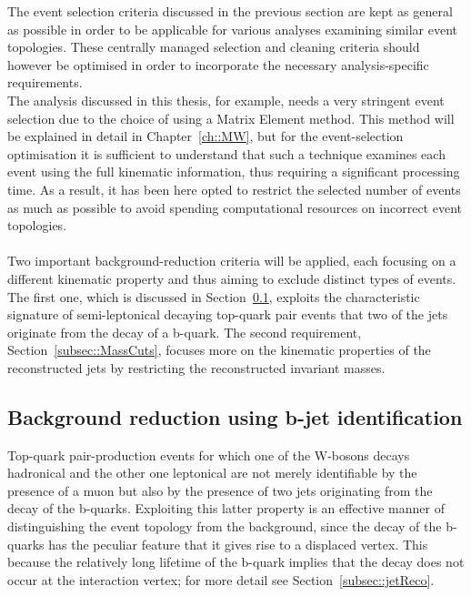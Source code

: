 The event selection criteria discussed in the previous section are kept as general as possible in order to be applicable for various analyses examining similar event topologies.
These centrally managed selection and cleaning criteria should however be optimised in order to incorporate the necessary analysis-specific requirements.
\\
The analysis discussed in this thesis, for example, needs a very stringent event selection due to the choice of using a Matrix Element method.
This method will be explained in detail in Chapter~\ref{ch::MW}, but for the event-selection optimisation it is sufficient to understand that such a technique examines each event using the full kinematic information, thus requiring a significant processing time. As a result, it has been here opted to restrict the selected number of events as much as possible to avoid spending computational resources on incorrect event topologies.
\\
\\
Two important background-reduction criteria will be applied, each focusing on a different kinematic property and thus aiming to exclude distinct types of events. 
The first one, which is discussed in Section~\ref{subsec::BTag}, exploits the characteristic signature of semi-leptonical decaying top-quark pair events that two of the jets originate from the decay of a b-quark. The second requirement, Section~\ref{subsec::MassCuts}, focuses more on the kinematic properties of the reconstructed jets by restricting the reconstructed invariant masses.

\subsection{Background reduction using b-jet identification}\label{subsec::BTag}

Top-quark pair-production events for which one of the W-bosons decays hadronical and the other one leptonical are not merely identifiable by the presence of a muon but also by the presence of two jets originating from the decay of the b-quarks.
Exploiting this latter property is an effective manner of distinguishing the event topology from the background, since the decay of the b-quarks has the peculiar feature that it gives rise to a displaced vertex. This because the relatively long lifetime of the b-quark implies that the decay does not occur at the interaction vertex; for more detail see Section~\ref{subsec::jetReco}.
\\ 

